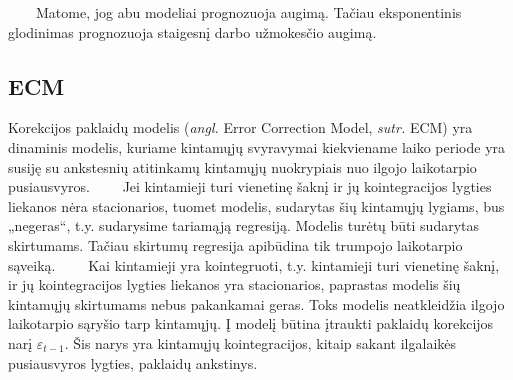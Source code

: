 \documentclass[12pt,a4paper]{article}
\theoremstyle{change}\newtheorem{salyga}{Uždavinys}
\begin{document}
\vskip 8pt  
$\qquad$Matome, jog abu modeliai prognozuoja augimą. Tačiau eksponentinis glodinimas prognozuoja staigesnį darbo užmokesčio augimą. 
     
     
     
     
     
     
     
\subsection{ECM}  
\medskip
\hspace{40pt}Korekcijos paklaidų modelis (\textit{angl.} Error Correction Model, \textit{sutr. }ECM) yra dinaminis modelis, kuriame kintamųjų svyravymai kiekviename laiko periode yra susiję su ankstesnių atitinkamų kintamųjų nuokrypiais nuo ilgojo laikotarpio pusiausvyros. 
\vskip 8pt  
$\qquad$Jei kintamieji turi vienetinę šaknį ir jų kointegracijos lygties liekanos nėra stacionarios, tuomet modelis, sudarytas šių kintamųjų lygiams, bus „negeras“, t.y. sudarysime tariamąją regresiją. Modelis turėtų būti sudarytas skirtumams. Tačiau skirtumų regresija apibūdina tik trumpojo laikotarpio sąveiką. 
\vskip 8pt  
$\qquad$Kai kintamieji yra kointegruoti, t.y. kintamieji turi vienetinę šaknį, ir jų kointegracijos lygties liekanos yra stacionarios, paprastas modelis šių kintamųjų skirtumams nebus pakankamai geras. Toks modelis neatkleidžia ilgojo laikotarpio sąryšio tarp kintamųjų. Į modelį būtina įtraukti paklaidų korekcijos narį $ \varepsilon_{t- 1}$. Šis narys yra kintamųjų kointegracijos, kitaip sakant ilgalaikės pusiausvyros  lygties, paklaidų ankstinys. 
\vskip 8pt   
     
\end{document}
